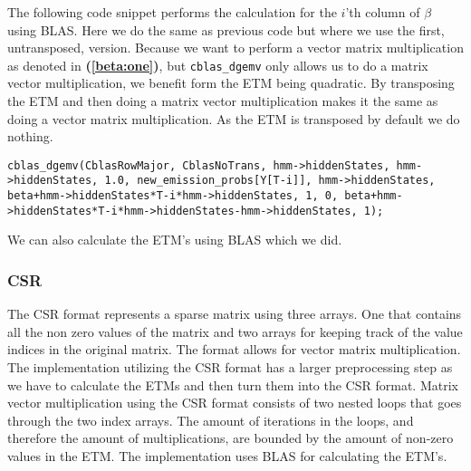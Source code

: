 The following code snippet performs the calculation for the $i$'th column of $\beta$ using BLAS. Here we do the same as previous code but where we use the first, untransposed, version. Because we want to perform a vector matrix multiplication as denoted in \textbf{(\ref{beta:one})}, but \texttt{cblas\_dgemv} only allows us to do a matrix vector multiplication, we benefit form the ETM being quadratic. By transposing the ETM and then doing a matrix vector multiplication makes it the same as doing a vector matrix multiplication. As the ETM is transposed by default we do nothing.
\begin{lstlisting}[style=CStyle]
cblas_dgemv(CblasRowMajor, CblasNoTrans, hmm->hiddenStates, hmm->hiddenStates, 1.0, new_emission_probs[Y[T-i]], hmm->hiddenStates, beta+hmm->hiddenStates*T-i*hmm->hiddenStates, 1, 0, beta+hmm->hiddenStates*T-i*hmm->hiddenStates-hmm->hiddenStates, 1);
\end{lstlisting}

We can also calculate the ETM's using BLAS which we did.

\subsubsection{CSR}\label{sec:csr}

The CSR format represents a sparse matrix using three arrays. One that contains all the non zero values of the matrix and two arrays for keeping track of the value indices in the original matrix. The format allows for vector matrix multiplication. The implementation utilizing the CSR format has a larger preprocessing step as we have to calculate the ETMs and then turn them into the CSR format. Matrix vector multiplication using the CSR format consists of two nested loops that goes through the two index arrays. The amount of iterations in the loops, and therefore the amount of multiplications, are bounded by the amount of non-zero values in the ETM. The implementation uses BLAS for calculating the ETM's.

